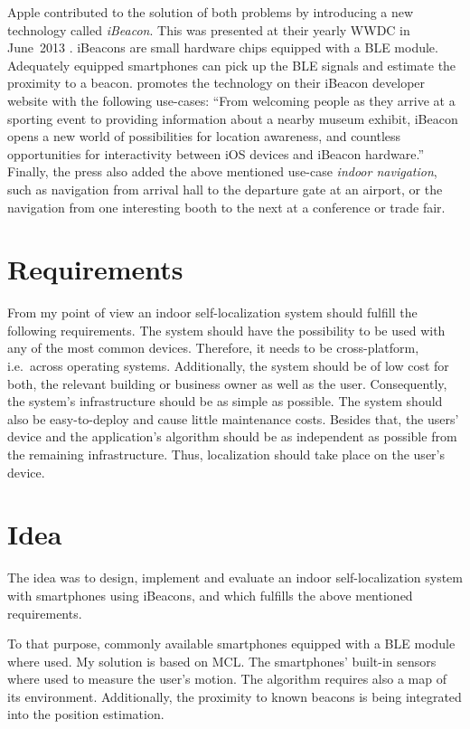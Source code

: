 Apple contributed to the solution of both problems by introducing a new technology called \emph{iBeacon}. This was presented at their yearly \ac{WWDC} in June~2013 \citep{apple:wwdc_2013_bruins}. iBeacons are small hardware chips equipped with a \ac{BLE} module. Adequately equipped smartphones can pick up the \acs{BLE} signals and estimate the proximity to a beacon. \citet{apple:ibeacon_site} promotes the technology on their iBeacon developer website with the following use-cases: ``From welcoming people as they arrive at a sporting event to providing information about a nearby museum exhibit, iBeacon opens a new world of possibilities for location awareness, and countless opportunities for interactivity between iOS devices and iBeacon hardware.'' Finally, the press also added the above mentioned use-case \emph{indoor navigation}, such as navigation from arrival hall to the departure gate at an airport, or the navigation from one interesting booth to the next at a conference or trade fair.


\section{Requirements}
From my point of view an indoor self-localization system should fulfill the following requirements. The system should have the possibility to be used with any of the most common devices. Therefore, it needs to be cross-platform, i.e.\ across operating systems. Additionally, the system should be of low cost for both, the relevant building or business owner as well as the user. Consequently, the system’s infrastructure should be as simple as possible. The system should also be easy-to-deploy and cause little maintenance costs. Besides that, the users’ device and the application's algorithm should be as independent as possible from the remaining infrastructure. Thus, localization should take place on the user’s device.


\section{Idea} %
The idea was to design, implement and evaluate an indoor self-localization system with smartphones using iBeacons, and which fulfills the above mentioned requirements.

To that purpose, commonly available smartphones equipped with a \acs{BLE} module where used. My solution is based on \ac{MCL}. The smartphones' built-in sensors where used to measure the user's motion. The algorithm requires also a map of its environment. Additionally, the proximity to known beacons is being integrated into the position estimation.

